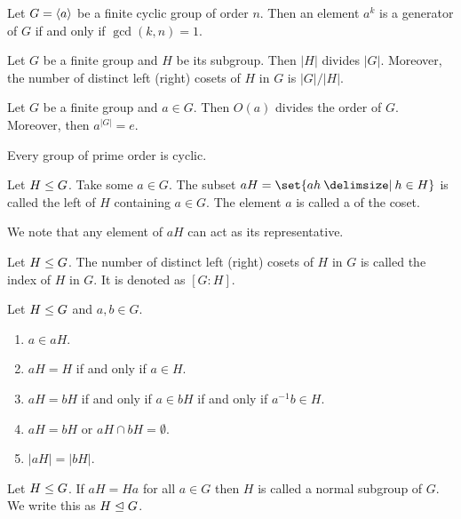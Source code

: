 \documentclass[11pt]{penrose}
\begin{document}
\begin{nthm}
    Let $G = \langle a\rangle$ be a finite cyclic group of order $n$. Then an element $a^k$ is a generator of $G$ if and only if $\gcd(k,n) = 1$.
\end{nthm}

\begin{nthm}[Lagrange]
    Let $G$ be a finite group and $H$ be its subgroup. Then $|H|$ divides $|G|$. Moreover, the number of distinct left (right) cosets of $H$ in $G$ is $|G|/|H|$.
\end{nthm}

\begin{ncor}
    Let $G$ be a finite group and $a \in G$. Then $O(a)$ divides the order of $G$. Moreover, then $a^{|G|} = e$.
\end{ncor}

\begin{ncor}
    Every group of prime order is cyclic.
\end{ncor}

\begin{ndfn}
    Let $H \mathrel{\leq} G$. Take some $a \in G$. The subset $aH = \set{ah \st h \in H}$ is called the left  of $H$ containing $a \in G$. The element $a$ is called a  of the coset.
\end{ndfn}

We note that any element of $aH$ can act as its representative.

\begin{ndfn}
    Let $H \mathrel{\leq} G$. The number of distinct left (right) cosets of $H$ in $G$ is called the index of $H$ in $G$. It is denoted as $[G:H]$.
\end{ndfn}

\begin{nthm}
    Let $H \mathrel{\leq} G$ and $a, b \in G$.
    \begin{enumerate}
        \item $a \in aH$.
        \item $aH = H$ if and only if $a \in H$.
        \item $aH = bH$ if and only if $a \in bH$ if and only if $a^{-1} b \in H$.
        \item $aH = bH$ or $aH \cap bH = \emptyset$.
        \item $|aH| = |bH|$.
    \end{enumerate}
\end{nthm}

\begin{ndfn}
    Let $H \mathrel{\leq} G$. If $aH = Ha$ for all $a \in G$ then $H$ is called a normal subgroup of $G$. We write this as $H \mathrel{\trianglelefteq} G$.
\end{ndfn}
\end{document}
